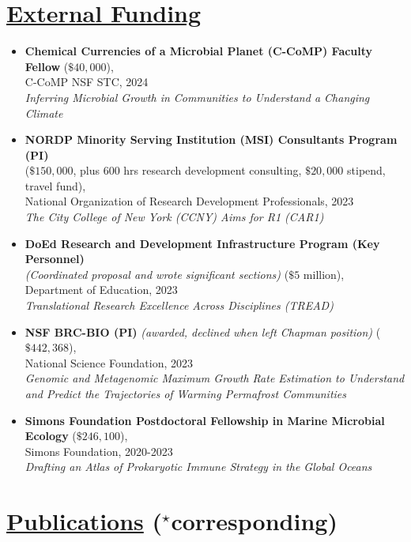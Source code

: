 \documentclass[]{res}
\begin{document}
\begin{resume}
\section{\underline{External Funding}} %
\begin{itemize} 
\item[] {\bf Chemical Currencies of a Microbial Planet (C-CoMP) Faculty Fellow} ($\$40,000$),\\ C-CoMP NSF STC, 2024\\\emph{Inferring Microbial Growth in Communities to Understand a Changing Climate}\\
\item[] {\bf NORDP Minority Serving Institution (MSI) Consultants Program (PI)}\\ ($\$150,000$, plus 600 hrs research development consulting, $\$20,000$ stipend, travel fund),\\ National Organization of Research Development Professionals, 2023\\\emph{The City College of New York (CCNY) Aims for R1 (CAR1)}\\
\item[] {\bf DoEd Research and Development Infrastructure Program (Key Personnel)}\\ \emph{(Coordinated proposal and wrote significant sections)} ($\$5$ million),\\ Department of Education, 2023\\\emph{Translational Research Excellence Across Disciplines (TREAD)}\\
\item[] {\bf NSF BRC-BIO (PI)} \emph{(awarded, declined when left Chapman position)} ($\$442,368$),\\ National Science Foundation, 2023\\\emph{Genomic and Metagenomic Maximum Growth Rate Estimation to Understand and Predict the Trajectories of Warming Permafrost Communities}\\
\item[] {\bf Simons Foundation Postdoctoral Fellowship in Marine Microbial Ecology} ($\$246,100$),\\ Simons Foundation, 2020-2023\\\emph{Drafting an Atlas of Prokaryotic Immune Strategy in the Global Oceans}
\end{itemize} 

\newpage
 
 \section{\underline{Publications} ($^\star$corresponding)} \vspace{2mm}
 

\end{resume}
\end{document}
